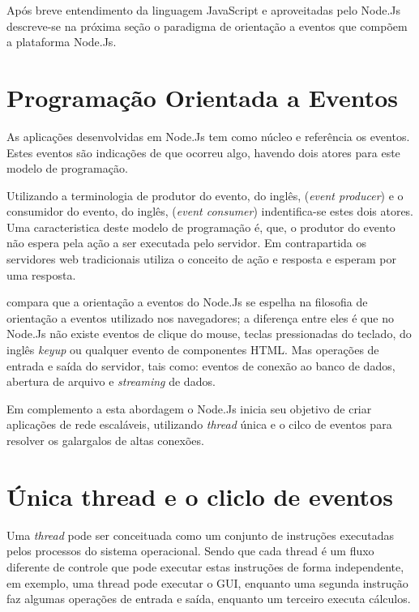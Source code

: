   Após breve entendimento da linguagem JavaScript e aproveitadas pelo Node.Js descreve-se na próxima seção
  o paradigma de orientação a eventos que compõem a plataforma Node.Js.
  
  
\section{Programação Orientada a Eventos}
\label{programacao-orientada-a-eventos}

  
  As aplicações desenvolvidas em Node.Js tem como núcleo e referência os eventos. Estes eventos são indicações de que ocorreu algo, 
  havendo dois atores para este modelo de programação.\cite{Oliveira:2012}
  
  Utilizando a terminologia de produtor do evento, do inglês, (\textit{event producer}) 
  e o consumidor do evento, do inglês, (\textit{event consumer}) indentifica-se estes dois atores. 
  Uma caracteristica deste modelo de programação é, que, o produtor do evento não espera pela ação a ser executada  pelo servidor. 
  Em contrapartida os servidores web tradicionais utiliza o conceito de ação e resposta e esperam por uma resposta.\cite{Junior:2012}  
  
   compara que a orientação a eventos do Node.Js se espelha na filosofia de orientação 
  a eventos utilizado nos navegadores; a diferença entre eles é que no Node.Js 
  não existe eventos de clique do mouse, teclas pressionadas do teclado, do inglês \textit{keyup} ou qualquer evento de componentes HTML. 
  Mas operações de entrada e saída do servidor, tais como: eventos de conexão ao banco de dados, abertura de arquivo e \textit{streaming}
  de dados.

  Em complemento a esta abordagem o Node.Js inicia seu objetivo de criar aplicações de rede escaláveis, utilizando \textit{thread} única
  e o cilco de eventos para resolver os galargalos de altas conexões.

\section{Única thread e o cliclo de eventos}
\label{single-thread}

  Uma \textit{thread} pode ser conceituada como um conjunto de instruções executadas pelos processos do sistema operacional.
  Sendo que cada thread é um fluxo diferente de controle que pode executar estas instruções de forma independente, em exemplo,
  uma thread pode executar o GUI, enquanto uma segunda instrução faz algumas operações de entrada e saída, 
  enquanto um terceiro executa cálculos. \cite{Lewis:1995}
  
